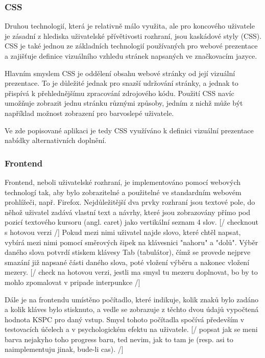 \documentclass{article}
\begin{document}
\subsubsection{CSS}

Druhou technologií, která je relativně málo využita, ale pro koncového uživatele je zásadní z hlediska uživatelské přívětivosti rozhraní, jsou kaskádové styly (CSS). CSS je také jednou ze základních technologií používaných pro webové prezentace a zajišťuje definice vizuálního vzhledu stránek napsaných ve značkovacím jazyce.

Hlavním smyslem CSS je oddělení obsahu webové stránky od její vizuální prezentace. To je důležité jednak pro snazší udržování stránky, a jednak to přispívá k přehlednějšímu zpracování zdrojového kódu. Použití CSS navíc umožňuje zobrazit jednu stránku různými způsoby, jedním z nichž může být například možnost zobrazení pro barvoslepé uživatele.

Ve zde popisované aplikaci je tedy CSS využíváno k definici vizuální prezentace nabídky alternativních doplnění.

\subsubsection{Frontend}

Frontend, neboli uživatelské rozhraní, je implementováno pomocí webových technologí tak, aby bylo zobrazitelné a použitelné ve standardním webovém prohlížeči, např. Firefox. Nejdůležitější dva prvky rozhraní jsou textové pole, do něhož uživatel zadává vlastní text a návrhy, které jsou zobrazovány přímo pod pozicí textového kursoru (angl. caret) jako vertikální seznam 4 slov. [/ checknout s hotovou verzi /] Pokud mezi nimi uživatel najde slovo, které chtěl napsat, vybírá mezi nimi pomocí směrových šipek na klávesnici "nahoru" a "dolů". Výběr daného slova potvrdí stiskem klávesy Tab (tabulátor), čímž se provede nejprve smazání již napsané části daného slova, poté vložení výběru a nakonec vložení mezery. [/ check na hotovou verzi, jestli ma smysl tu mezeru doplnovat, bo by to mohlo zpomalovat v pripade interpunkce /] 

Dále je na frontendu umístěno počítadlo, které indikuje, kolik znaků bylo zadáno a kolik kláves bylo stisknuto, a vedle se zobrazuje z těchto dvou údajů vypočtená hodnota KSPC pro daný vstup. Smysl tohoto počítadla spočívá především v testovacích účelech a v psychologickém efektu na uživatele. [/ popsat jak se meni barva nejakyho toho progress baru, ted nevim, jak to tam je (resp. asi to naimplementuju jinak, bude-li cas). /]
\end{document}

